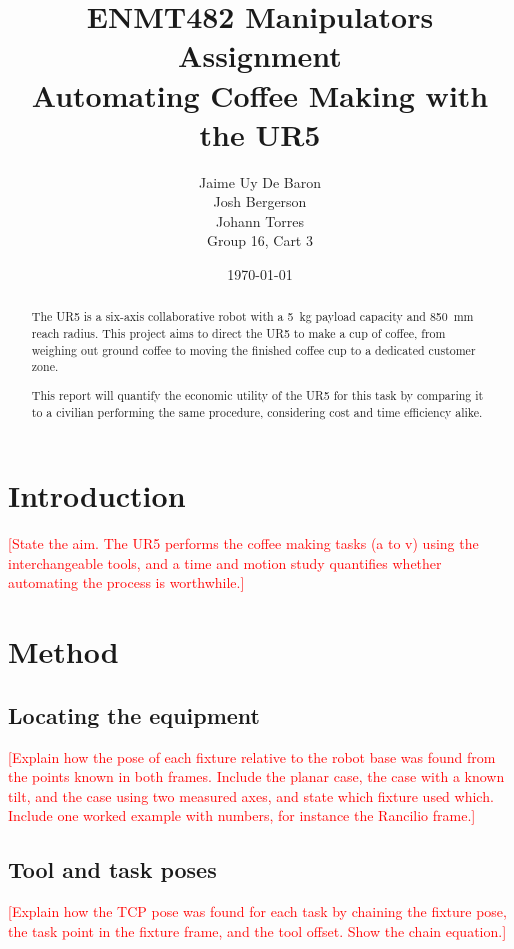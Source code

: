 \documentclass[11pt,a4paper]{article}
\title{ENMT482 Manipulators Assignment\\[2mm]
       \large Automating Coffee Making with the UR5}
\author{
    Jaime Uy De Baron \\
    Josh Bergerson \\
    Johann Torres\\[2mm]
    Group 16, Cart 3
}
\date{\today}
\newcommand{\todo}[1]{\textcolor{red}{[#1]}}
\begin{document}
\maketitle

\begin{abstract}
The UR5 is a six-axis collaborative robot with a 5~kg payload capacity and 850~mm reach radius. This project aims to direct the UR5 to make a cup of coffee, from weighing out ground coffee to moving the finished coffee cup to a dedicated customer zone. 

This report will quantify the economic utility of the UR5 for this task by comparing it to a civilian performing the same procedure, considering cost and time efficiency alike. 
\end{abstract}

\section{Introduction}
\todo{State the aim. The UR5 performs the coffee making tasks (a to v) using
the interchangeable tools, and a time and motion study quantifies whether
automating the process is worthwhile.}

\section{Method}

\subsection{Locating the equipment}
\todo{Explain how the pose of each fixture relative to the robot base was found
from the points known in both frames. Include the planar case, the case with a
known tilt, and the case using two measured axes, and state which fixture used
which. Include one worked example with numbers, for instance the Rancilio
frame.}

\subsection{Tool and task poses}
\todo{Explain how the TCP pose was found for each task by chaining the fixture
pose, the task point in the fixture frame, and the tool offset. Show the chain
equation.}
\end{document}
